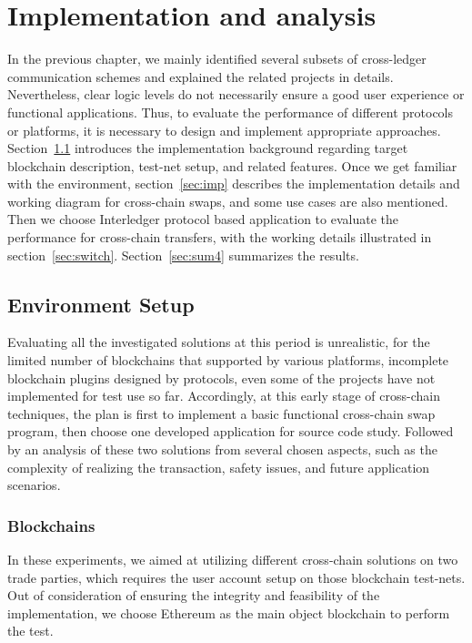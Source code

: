 \chapter{Implementation and analysis} 
\label{chap:4}
\noindent In the previous chapter, we mainly identified several subsets of cross-ledger communication schemes and explained the related projects in details. Nevertheless, clear logic levels do not necessarily ensure a good user experience or functional applications. Thus, to evaluate the performance of different protocols or platforms, it is necessary to design and implement appropriate approaches. \\

\noindent Section~\ref{sec:env} introduces the implementation background regarding target blockchain description, test-net setup, and related features. Once we get familiar with the environment, section~\ref{sec:imp} describes the implementation details and working diagram for cross-chain swaps, and some use cases are also mentioned. Then we choose Interledger protocol based application to evaluate the performance for cross-chain transfers, with the working details illustrated in section~\ref{sec:switch}. Section~\ref{sec:sum4} summarizes the results. 

\section{Environment Setup}
\label{sec:env}
\noindent Evaluating all the investigated solutions at this period is unrealistic, for the limited number of blockchains that supported by various platforms, incomplete blockchain plugins designed by protocols, even some of the projects have not implemented for test use so far. Accordingly, at this early stage of cross-chain techniques, the plan is first to implement a basic functional cross-chain swap program, then choose one developed application for source code study. Followed by an analysis of these two solutions from several chosen aspects, such as the complexity of realizing the transaction, safety issues, and future application scenarios.\\
\subsection{Blockchains}
\noindent In these experiments, we aimed at utilizing different cross-chain solutions on two trade parties, which requires the user account setup on those blockchain test-nets. Out of consideration of ensuring the integrity and feasibility of the implementation, we choose Ethereum as the main object blockchain to perform the test.\\

